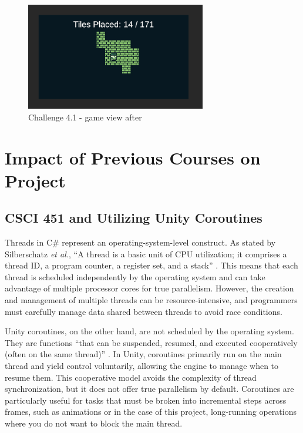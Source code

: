 \documentclass[a4paper, 12pt, one column, aas_macros]{article}
\begin{document}
\begin{figure}[htbp]
  \centering
  \includegraphics[width=0.7\textwidth]{images/difficulty-1-after.png}
  \caption{Challenge 4.1 - game view after}
  \label{fig:difficulty-1-after}
\end{figure}

\section{Impact of Previous Courses on Project}
\subsection{CSCI 451 and Utilizing Unity Coroutines}
Threads in C\# represent an operating-system-level construct. As stated by Silberschatz \emph{et al.}, ``A thread is a basic unit of CPU utilization; it comprises a thread ID, a program counter, a register set, and a stack'' \cite{silberschatz}. This means that each thread is scheduled independently by the operating system and can take advantage of multiple processor cores for true parallelism. However, the creation and management of multiple threads can be resource-intensive, and programmers must carefully manage data shared between threads to avoid race conditions. 

Unity coroutines, on the other hand, are not scheduled by the operating system. They are functions ``that can be suspended, resumed, and executed cooperatively (often on the same thread)'' \cite{nosenko}. In Unity, coroutines primarily run on the main thread and yield control voluntarily, allowing the engine to manage when to resume them. This cooperative model avoids the complexity of thread synchronization, but it does not offer true parallelism by default. Coroutines are particularly useful for tasks that must be broken into incremental steps across frames, such as animations or in the case of this project, long-running operations where you do not want to block the main thread.
\end{document}
